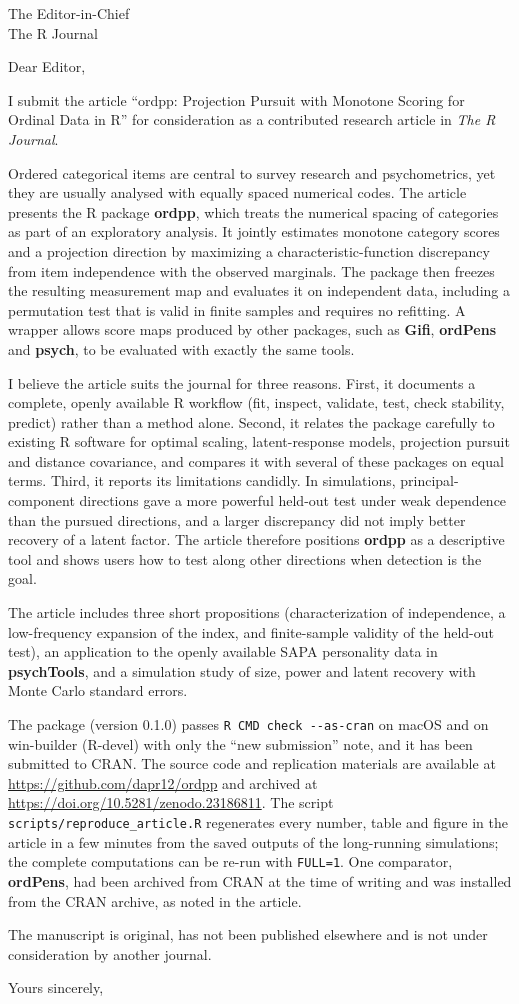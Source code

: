 \documentclass[11pt,a4paper]{letter}
\begin{document}
\begin{letter}{The Editor-in-Chief\\The R Journal}
\opening{Dear Editor,}

I submit the article ``ordpp: Projection Pursuit with Monotone Scoring for Ordinal Data in R'' for consideration as a contributed research article in \emph{The R Journal}.

Ordered categorical items are central to survey research and psychometrics, yet they are usually analysed with equally spaced numerical codes. The article presents the R package \textbf{ordpp}, which treats the numerical spacing of categories as part of an exploratory analysis. It jointly estimates monotone category scores and a projection direction by maximizing a characteristic-function discrepancy from item independence with the observed marginals. The package then freezes the resulting measurement map and evaluates it on independent data, including a permutation test that is valid in finite samples and requires no refitting. A wrapper allows score maps produced by other packages, such as \textbf{Gifi}, \textbf{ordPens} and \textbf{psych}, to be evaluated with exactly the same tools.

I believe the article suits the journal for three reasons. First, it documents a complete, openly available R workflow (fit, inspect, validate, test, check stability, predict) rather than a method alone. Second, it relates the package carefully to existing R software for optimal scaling, latent-response models, projection pursuit and distance covariance, and compares it with several of these packages on equal terms. Third, it reports its limitations candidly. In simulations, principal-component directions gave a more powerful held-out test under weak dependence than the pursued directions, and a larger discrepancy did not imply better recovery of a latent factor. The article therefore positions \textbf{ordpp} as a descriptive tool and shows users how to test along other directions when detection is the goal.

The article includes three short propositions (characterization of independence, a low-frequency expansion of the index, and finite-sample validity of the held-out test), an application to the openly available SAPA personality data in \textbf{psychTools}, and a simulation study of size, power and latent recovery with Monte Carlo standard errors.

The package (version 0.1.0) passes \texttt{R CMD check -{}-as-cran} on macOS and on win-builder (R-devel) with only the ``new submission'' note, and it has been submitted to CRAN. The source code and replication materials are available at \url{https://github.com/dapr12/ordpp} and archived at \url{https://doi.org/10.5281/zenodo.23186811}. The script \texttt{scripts/reproduce\_article.R} regenerates every number, table and figure in the article in a few minutes from the saved outputs of the long-running simulations; the complete computations can be re-run with \texttt{FULL=1}. One comparator, \textbf{ordPens}, had been archived from CRAN at the time of writing and was installed from the CRAN archive, as noted in the article.

The manuscript is original, has not been published elsewhere and is not under consideration by another journal.

\closing{Yours sincerely,}
\end{letter}
\end{document}
